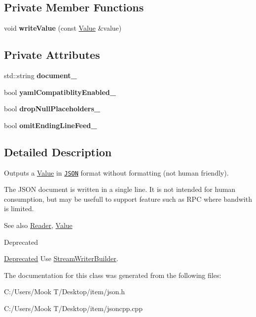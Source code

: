 \subsection*{Private Member Functions}
\begin{DoxyCompactItemize}
\item 
\hypertarget{class_json_1_1_fast_writer_a2ef4a2ce13a341171f01f414f4fdd765}{}void {\bfseries write\+Value} (const \hyperlink{class_json_1_1_value}{Value} \&value)\label{class_json_1_1_fast_writer_a2ef4a2ce13a341171f01f414f4fdd765}

\end{DoxyCompactItemize}
\subsection*{Private Attributes}
\begin{DoxyCompactItemize}
\item 
\hypertarget{class_json_1_1_fast_writer_afc70d465b79bfc7741ff75294dcefeab}{}std\+::string {\bfseries document\+\_\+}\label{class_json_1_1_fast_writer_afc70d465b79bfc7741ff75294dcefeab}

\item 
\hypertarget{class_json_1_1_fast_writer_a4c4c1911179bf472d24492915b0e489a}{}bool {\bfseries yaml\+Compatiblity\+Enabled\+\_\+}\label{class_json_1_1_fast_writer_a4c4c1911179bf472d24492915b0e489a}

\item 
\hypertarget{class_json_1_1_fast_writer_a97e9d4ff84b59a48756dcc27a71b5904}{}bool {\bfseries drop\+Null\+Placeholders\+\_\+}\label{class_json_1_1_fast_writer_a97e9d4ff84b59a48756dcc27a71b5904}

\item 
\hypertarget{class_json_1_1_fast_writer_abd6e13851db6dcf59d84af68d48d50ac}{}bool {\bfseries omit\+Ending\+Line\+Feed\+\_\+}\label{class_json_1_1_fast_writer_abd6e13851db6dcf59d84af68d48d50ac}

\end{DoxyCompactItemize}


\subsection{Detailed Description}
Outputs a \hyperlink{class_json_1_1_value}{Value} in \href{http://www.json.org}{\tt J\+S\+O\+N} format without formatting (not human friendly). 

The J\+S\+O\+N document is written in a single line. It is not intended for \textquotesingle{}human\textquotesingle{} consumption, but may be usefull to support feature such as R\+P\+C where bandwith is limited. \begin{DoxySeeAlso}{See also}
\hyperlink{class_json_1_1_reader}{Reader}, \hyperlink{class_json_1_1_value}{Value} 
\end{DoxySeeAlso}
\begin{DoxyRefDesc}{Deprecated}
\item[\hyperlink{deprecated__deprecated000008}{Deprecated}]Use \hyperlink{class_json_1_1_stream_writer_builder}{Stream\+Writer\+Builder}. \end{DoxyRefDesc}


The documentation for this class was generated from the following files\+:\begin{DoxyCompactItemize}
\item 
C\+:/\+Users/\+Mook T/\+Desktop/item/json.\+h\item 
C\+:/\+Users/\+Mook T/\+Desktop/item/jsoncpp.\+cpp\end{DoxyCompactItemize}
